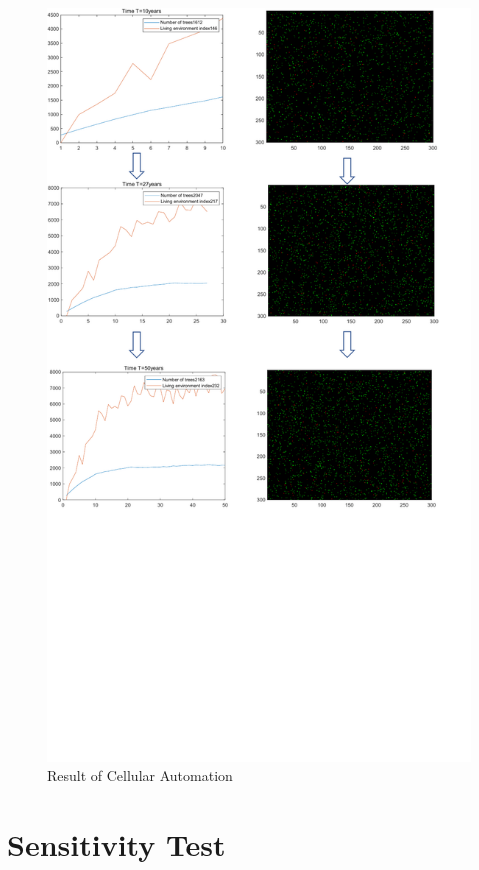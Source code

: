 \documentclass{mcmthesis}
\numberwithin{figure}{section}
\numberwithin{table}{section}
\numberwithin{equation}{section}
\begin{document}
\begin{figure}[t]
  \centering
  \includegraphics[width = 14cm]{code&pic/CA-pic.pdf}
  \caption{Result of Cellular Automation}\label{CA_Result}
\end{figure}


\section{Sensitivity Test}
\end{document}
